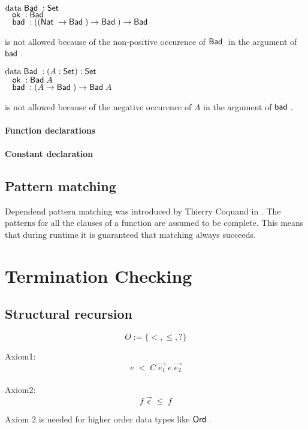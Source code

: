 \begin{bsp}
$\mathrm{data}\; \mathsf{Bad}\; : \mathsf{Set} $ \\
$\hspace*{3mm} \mathsf{ok}\; : \mathsf{Bad}\;$\\
$\hspace*{3mm} \mathsf{bad}\; : ((\mathsf{Nat}\; \rightarrow \mathsf{Bad}\;) \rightarrow \mathsf{Bad}\;) \rightarrow \mathsf{Bad}\;  $
\end{bsp}
is not allowed because of the non-positive occurence of $\mathsf{Bad}\;$ in the argument of $\mathsf{bad}\;$.


\begin{bsp}
$\mathrm{data}\; \mathsf{Bad}\; : ( A : \mathsf{Set} ) : \mathsf{Set} $\\
$\hspace*{3mm} \mathsf{ok}\; : \mathsf{Bad}\; A$\\
$\hspace*{3mm} \mathsf{bad}\; : (A \rightarrow \mathsf{Bad}\;) \rightarrow \mathsf{Bad}\; A$
\end{bsp}
is not allowed because of the negative occurence of $A$ in the argument of $\mathsf{bad}\;$.

\subsubsection{Function declarations}

\subsubsection{Constant declaration}

\section{Pattern matching}
Dependend pattern matching was introduced by Thierry Coquand in \cite{coquand92pattern}.
The patterns for all the clauses of a function are assumed to be complete. This means that during runtime
it is guaranteed that matching always succeeds.

\chapter{Termination Checking}

\section{Structural recursion}

\begin{definition}[Order]
\[ O := \{ < , \leq , ? \} \]
\end{definition}
Axiom1:
\[ e \; < \; C \; \vec{e_1} \; e \; \vec{e_2} \]
\\
Axiom2:
\[ f \; \vec{e} \; \leq \; f \] 

Axiom 2 is needed for higher order data types like $\mathsf{Ord}\;$.

